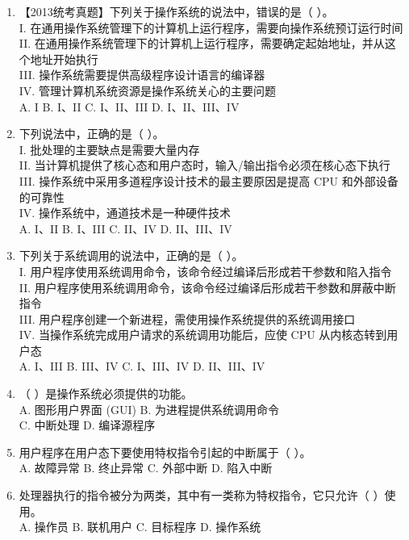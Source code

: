 \documentclass[lang=cn,newtx,10pt,scheme=chinese]{../../elegantbook}
\begin{document}
\begin{enumerate}
  \item 【2013统考真题】下列关于操作系统的说法中，错误的是（ ）。\\
  I. 在通用操作系统管理下的计算机上运行程序，需要向操作系统预订运行时间\\
  II. 在通用操作系统管理下的计算机上运行程序，需要确定起始地址，并从这个地址开始执行\\
  III. 操作系统需要提供高级程序设计语言的编译器\\
  IV. 管理计算机系统资源是操作系统关心的主要问题\\
  A. I \quad B. I、II \quad C. I、II、III \quad D. I、II、III、IV

  \item 下列说法中，正确的是（ ）。\\
  I. 批处理的主要缺点是需要大量内存\\
  II. 当计算机提供了核心态和用户态时，输入/输出指令必须在核心态下执行\\
  III. 操作系统中采用多道程序设计技术的最主要原因是提高 CPU 和外部设备的可靠性\\
  IV. 操作系统中，通道技术是一种硬件技术\\
  A. I、II \quad B. I、III \quad C. II、IV \quad D. II、III、IV

  \item 下列关于系统调用的说法中，正确的是（ ）。\\
  I. 用户程序使用系统调用命令，该命令经过编译后形成若干参数和陷入指令\\
  II. 用户程序使用系统调用命令，该命令经过编译后形成若干参数和屏蔽中断指令\\
  III. 用户程序创建一个新进程，需使用操作系统提供的系统调用接口\\
  IV. 当操作系统完成用户请求的系统调用功能后，应使 CPU 从内核态转到用户态\\
  A. I、III \quad B. III、IV \quad C. I、III、IV \quad D. II、III、IV

  \item （ ）是操作系统必须提供的功能。\\
  A. 图形用户界面 (GUI) \quad B. 为进程提供系统调用命令\\
  C. 中断处理 \quad D. 编译源程序

  \item 用户程序在用户态下要使用特权指令引起的中断属于（ ）。\\
  A. 故障异常 \quad B. 终止异常 \quad C. 外部中断 \quad D. 陷入中断

  \item 处理器执行的指令被分为两类，其中有一类称为特权指令，它只允许（ ）使用。\\
  A. 操作员 \quad B. 联机用户 \quad C. 目标程序 \quad D. 操作系统


\end{enumerate}
\end{document}
